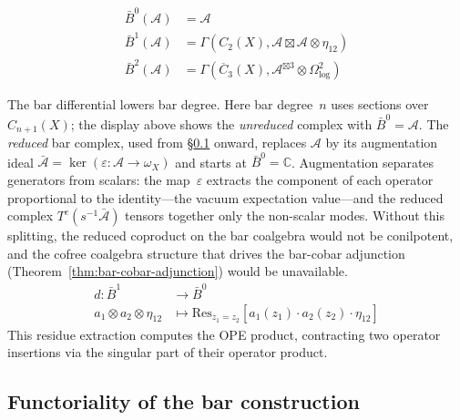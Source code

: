 \begin{example}
\begin{align}
\bar{B}^0(\mathcal{A}) &= \mathcal{A} \\
\bar{B}^1(\mathcal{A}) &= \Gamma(C_2(X), \mathcal{A} \boxtimes \mathcal{A} \otimes \eta_{12}) \\
\bar{B}^2(\mathcal{A}) &= \Gamma(\overline{C}_3(X), \mathcal{A}^{\boxtimes 3} \otimes \Omega^2_{\log})
\end{align}

The bar differential lowers bar degree.  Here bar degree~$n$ uses sections over $C_{n+1}(X)$; the display above shows the \emph{unreduced} complex with $\bar{B}^0 = \mathcal{A}$.  The \emph{reduced} bar complex, used from \S\ref{subsec:bar-functoriality} onward, replaces $\mathcal{A}$ by its augmentation ideal $\bar{\mathcal{A}} = \ker(\varepsilon \colon \mathcal{A} \to \omega_X)$ and starts at $\bar{B}^0 = \mathbb{C}$.  Augmentation separates generators from scalars: the map~$\varepsilon$ extracts the component of each operator proportional to the identity---the vacuum expectation value---and the reduced complex $T^c(s^{-1}\bar{\mathcal{A}})$ tensors together only the non-scalar modes.  Without this splitting, the reduced coproduct on the bar coalgebra would not be conilpotent, and the cofree coalgebra structure that drives the bar-cobar adjunction (Theorem~\ref{thm:bar-cobar-adjunction}) would be unavailable.
\begin{align}
d: \bar{B}^1 &\to \bar{B}^0 \\
a_1 \otimes a_2 \otimes \eta_{12} &\mapsto \text{Res}_{z_1=z_2}[a_1(z_1) \cdot a_2(z_2) \cdot \eta_{12}]
\end{align}
This residue extraction computes the OPE product, contracting two operator insertions via the singular part of their operator product.
\end{example}

\subsection{Functoriality of the bar construction}
\label{subsec:bar-functoriality}

